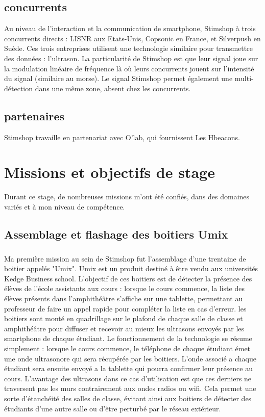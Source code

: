 \documentclass[12pt]{report}
\begin{document}
	\section{concurrents}

Au niveau de l'interaction et la communication de smartphone, Stimshop à trois concurrents directs : LISNR aux Etats-Unis, Copsonic en France, et Silverpush en Suède. Ces trois entreprises utilisent une technologie similaire pour transmettre des données : l'ultrason. La particularité de Stimshop est que leur signal joue sur la modulation linéaire de fréquence là où leurs concurrents jouent sur l'intensité du signal (similaire au morse). Le signal Stimshop permet également une multi-détection dans une même zone, absent chez les concurrents. 

	\section{partenaires}
		
Stimshop travaille en partenariat avec O'lab, qui fournissent Les Hbeacons. 

\chapter{Missions et objectifs de stage}
		
Durant ce stage, de nombreuses missions m'ont été confiés, dans des domaines variés et à mon niveau de compétence. 

	\section{Assemblage et flashage des boitiers Umix}
		
\paragraph{}
Ma première mission au sein de Stimshop fut l'assemblage d'une trentaine de boitier appelés "Umix". Umix est un produit destiné à être vendu aux universités Kedge Business school. L'objectif de ces boitiers est de détecter la présence des élèves de l'école assistants aux cours : lorsque le cours commence, la liste des élèves présents dans l'amphithéâtre s'affiche sur une tablette, permettant au professeur de faire un appel rapide pour compléter la liste en cas d'erreur. les boitiers sont monté en quadrillage sur le plafond de chaque salle de classe et amphithéâtre pour diffuser et recevoir au mieux les ultrasons envoyés par les smartphone de chaque étudiant. Le fonctionnement de la technologie se résume simplement : lorsque le cours commence, le téléphone de chaque étudiant émet une onde ultrasonore qui sera récupérée par les boitiers. L'onde associé a chaque étudiant sera ensuite envoyé a la tablette qui pourra confirmer leur présence au cours. L'avantage des ultrasons dans ce cas d'utilisation est que ces derniers ne traversent pas les murs contrairement aux ondes radios ou wifi. Cela permet une sorte d'étanchéité des salles de classe, évitant ainsi aux boitiers de détecter des étudiants d'une autre salle ou d'être perturbé par le réseau extérieur.  
\end{document}
